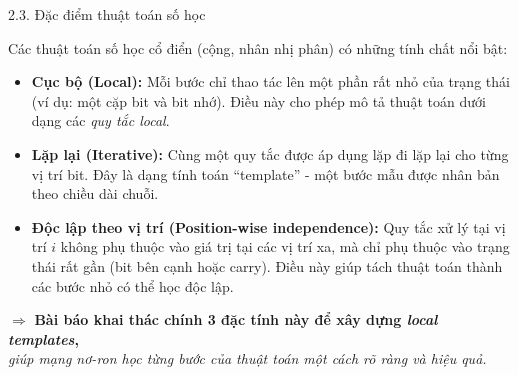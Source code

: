 \documentclass[10pt, aspectratio=169]{beamer}
\begin{document}
\begin{frame}{2.3. Đặc điểm thuật toán số học}

Các thuật toán số học cổ điển (cộng, nhân nhị phân) có những tính chất nổi bật:

\begin{itemize}

    \item \textbf{Cục bộ (Local):}  
    Mỗi bước chỉ thao tác lên một phần rất nhỏ của trạng thái  
    (ví dụ: một cặp bit và bit nhớ).  
    Điều này cho phép mô tả thuật toán dưới dạng các \textit{quy tắc local}.

    \item \textbf{Lặp lại (Iterative):}  
    Cùng một quy tắc được áp dụng lặp đi lặp lại cho từng vị trí bit.  
    Đây là dạng tính toán “template” - một bước mẫu được nhân bản theo chiều dài chuỗi.

    \item \textbf{Độc lập theo vị trí (Position-wise independence):}  
    Quy tắc xử lý tại vị trí $i$ không phụ thuộc vào giá trị tại các vị trí xa,  
    mà chỉ phụ thuộc vào trạng thái rất gần (bit bên cạnh hoặc carry).
    Điều này giúp tách thuật toán thành các bước nhỏ có thể học độc lập.

\end{itemize}

\vspace{0.3cm}
\centering
$\Rightarrow$ \textbf{Bài báo khai thác chính 3 đặc tính này để xây dựng \textit{local templates},}
\\
\textit{giúp mạng nơ-ron học từng bước của thuật toán một cách rõ ràng và hiệu quả.}

\end{frame}
\end{document}
